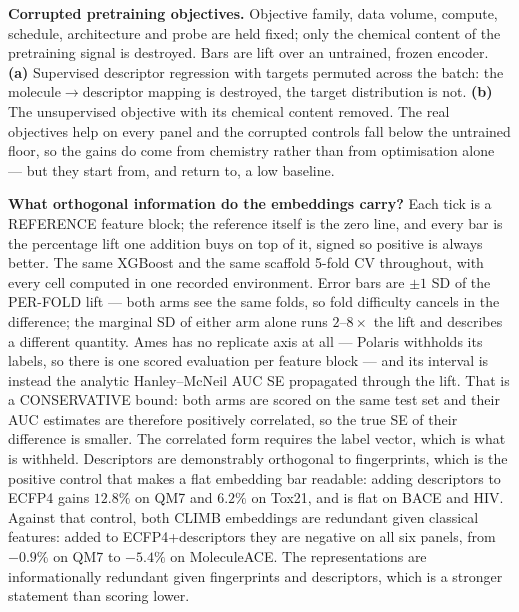 \caption{\textbf{Corrupted pretraining objectives.}
Objective family, data volume, compute, schedule, architecture and probe are held fixed; only
the chemical content of the pretraining signal is destroyed. Bars are lift over an untrained,
frozen encoder.
\textbf{(a)} Supervised descriptor regression with targets permuted across the batch: the
molecule$\rightarrow$descriptor mapping is destroyed, the target distribution is not.
\textbf{(b)} The unsupervised objective with its chemical content removed.
The real objectives help on every panel and the corrupted controls fall below the untrained
floor, so the gains do come from chemistry rather than from optimisation alone --- but they
start from, and return to, a low baseline.}

\caption{\textbf{What orthogonal information do the embeddings carry?}
Each tick is a REFERENCE feature block; the reference itself is the zero line, and every bar is the
percentage lift one addition buys on top of it, signed so positive is always better. The same
XGBoost and the same scaffold 5-fold CV throughout, with every cell computed in one recorded
environment. Error bars are $\pm1$ SD of the PER-FOLD lift --- both arms see the same folds, so
fold difficulty cancels in the difference; the marginal SD of either arm alone runs $2$--$8\times$
the lift and describes a different quantity. Ames has no replicate axis at all --- Polaris withholds its labels, so there is one scored
evaluation per feature block --- and its interval is instead the analytic Hanley--McNeil AUC SE
propagated through the lift. That is a CONSERVATIVE bound: both arms are scored on the same test
set and their AUC estimates are therefore positively correlated, so the true SE of their difference
is smaller. The correlated form requires the label vector, which is what is withheld.
Descriptors are demonstrably orthogonal to fingerprints, which is the positive control that makes a
flat embedding bar readable: adding descriptors to ECFP4 gains $12.8\%$ on QM7 and $6.2\%$ on
Tox21, and is flat on BACE and HIV.
Against that control, both CLIMB embeddings are redundant given classical features: added to
ECFP4+descriptors they are negative on all six panels, from $-0.9\%$ on QM7 to $-5.4\%$ on
MoleculeACE. The representations are informationally redundant given fingerprints and descriptors,
which is a stronger statement than scoring lower.}

